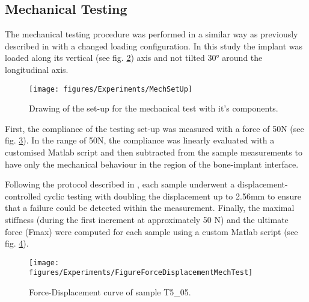 \documentclass[12pt, a4paper, twoside]{report}
\begin{document}
% 
%
\begin{figure}[H]
\centering 
{}
\label{fig:Bohrlehre}
\end{figure}
%
\subsection{Mechanical Testing}
%
The mechanical testing procedure was performed in a similar way as previously described in \cite{Voumard2015} with a changed loading configuration. In this study the implant was loaded along its vertical (see fig. \ref{fig:MechSetUp}) axis and not tilted 30° around the longitudinal axis.
\begin{figure}[H]
  \centering
      \texttt{[image: figures/Experiments/MechSetUp]}
  \caption{Drawing of the set-up for the mechanical test with it's components.}
  \label{fig:MechSetUp}
\end{figure} 
 
First, the compliance of the testing set-up was measured with a force of 50N (see fig. \ref{fig:FigureComplianceTest}). In the range of 50N, the compliance was linearly evaluated with a customised Matlab script and then subtracted from the sample measurements to have only the mechanical behaviour in the region of the bone-implant interface. 
\begin{figure}[H]
\centering
{}
\label{fig:FigureComplianceTest}
\end{figure}


%
Following the protocol described in \cite{Voumard2015}, each sample underwent a displacement-controlled cyclic testing with doubling the displacement up to 2.56mm to ensure that a failure could be detected within the measurement. Finally, the maximal stiffness (during the first increment at approximately 50 N) and the ultimate force (Fmax) were computed for each sample using a custom Matlab script (see fig.  \ref{fig:FigureForceDisplacementMechTest}).
%
%
\begin{figure}[H]
  \centering
      \texttt{[image: figures/Experiments/FigureForceDisplacementMechTest]}
  \caption{Force-Displacement curve of sample T5\_05.}
  \label{fig:FigureForceDisplacementMechTest}
\end{figure}
%
%
\end{document}
